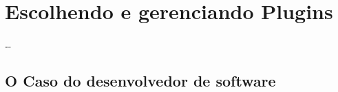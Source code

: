 \chapter{Escolhendo e gerenciando Plugins}
\ldots
\section{O Caso do desenvolvedor de software}
\newpage

